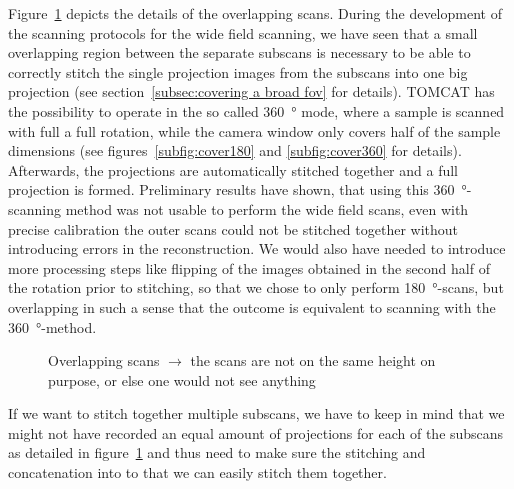 Figure~\ref{fig:overlapping scans} depicts the details of the overlapping scans. During the development of the scanning protocols for the wide field scanning, we have seen that a small overlapping region between the separate subscans is necessary to be able to correctly stitch the single projection images from the subscans into one big projection (see section~\ref{subsec:covering a broad fov} for details). TOMCAT has the possibility to operate in the so called \SI{360}{\degree} mode, where a sample is scanned with full a full rotation, while the camera window only covers half of the sample dimensions (see figures~\ref{subfig:cover180} and \ref{subfig:cover360} for details). Afterwards, the projections are automatically stitched together and a full projection is formed. Preliminary results have shown, that using this \SI{360}{\degree}-scanning method was not usable to perform the wide field scans, even with precise calibration the outer scans could not be stitched together without introducing errors in the reconstruction. We would also have needed to introduce more processing steps like flipping of the images obtained in the second half of the rotation prior to stitching, so that we chose to only perform \SI{180}{\degree}-scans, but overlapping in such a sense that the outcome is equivalent to scanning with the \SI{360}{\degree}-method.

\begin{figure}
	\centering
	
	\caption{Overlapping scans $\rightarrow$ the scans are not on the same height on purpose, or else one would not see anything}
	\label{fig:overlapping scans}
\end{figure}	

If we want to stitch together multiple subscans,  we have to keep in mind that we might not have recorded an equal amount of projections for each of the subscans as detailed in figure~\ref{fig:overlapping scans} and thus need to make sure the stitching and concatenation into to that we can easily stitch them together.

